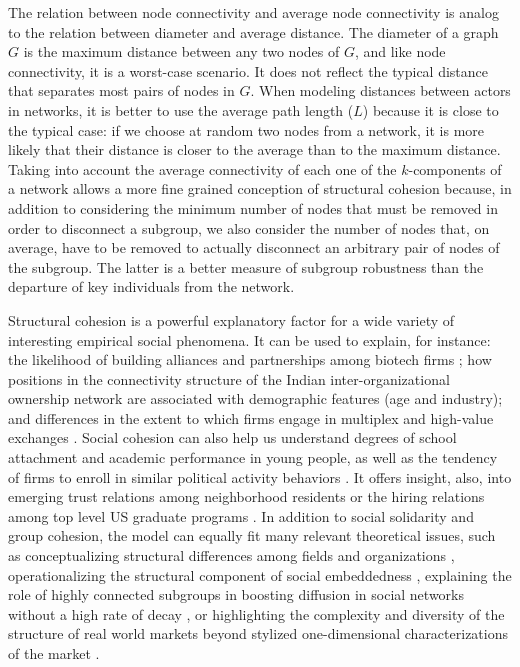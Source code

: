 The relation between node connectivity and average node connectivity is analog to the relation between diameter and average distance. The diameter of a graph $G$ is the maximum distance between any two nodes of $G$, and like node connectivity, it is a worst-case scenario. It does not reflect the typical distance that separates most pairs of nodes in $G$. When modeling distances between actors in networks, it is better to use the average path length ($L$) because it is close to the typical case: if we choose at random two nodes from a network, it is more likely that their distance is closer to the average than to the maximum distance. Taking into account the average connectivity of each one of the $k$-components of a network allows a more fine grained conception of structural cohesion because, in addition to considering the minimum number of nodes that must be removed in order to disconnect a subgroup, we also consider the number of nodes that, on average, have to be removed to actually disconnect an arbitrary pair of nodes of the subgroup. The latter is a better measure of subgroup robustness than the departure of key individuals from the network.

Structural cohesion is a powerful explanatory factor for a wide variety of interesting empirical social phenomena. It can be used to explain, for instance: the likelihood of building alliances and partnerships among biotech firms \citep{powell:2005}; how positions in the connectivity structure of the Indian inter-organizational ownership network are associated with demographic features (age and industry); and differences in the extent to which firms engage in multiplex and high-value exchanges \citep{mani:2014}. Social cohesion can also help us understand degrees of school attachment and academic performance in young people, as well as the tendency of firms to enroll in similar political activity behaviors \citep{moody:2003}.  It offers insight, also, into emerging trust relations among neighborhood residents or the hiring relations among top level US graduate programs \citep{grannis:2009}. In addition to social solidarity and group cohesion, the model can equally fit many relevant theoretical issues, such as conceptualizing structural differences among fields and organizations \citep{white:2004}, operationalizing the structural component of social embeddedness \citep{granovetter:1985,moody:2004}, explaining the role of highly connected subgroups in boosting diffusion in social networks without a high rate of decay \citep{moody:2004, white:2001}, or highlighting the complexity and diversity of the structure of real world markets beyond stylized one-dimensional characterizations of the market \citep{mani:2014}.

